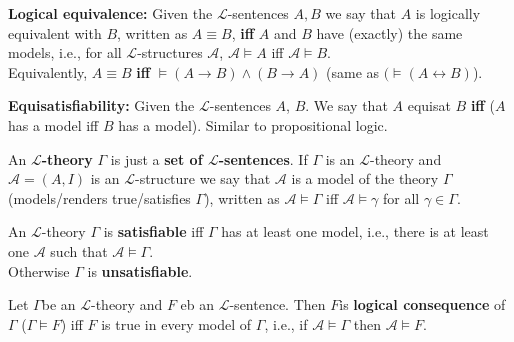 \nn

\begin{definition}
	\textbf{Logical equivalence:} Given the $\mathcal{L}$-sentences $A,B$ we say that $A$ is logically equivalent with $B$, written as $A \equiv B$, \textbf{iff} $A$ and $B$ have (exactly) the same models, i.e., for all $\mathcal{L}$-structures $\mathcal{A}$, $\mathcal{A} \models A$ iff $\mathcal{A} \models B$.\\
	
	Equivalently, $A \equiv B$ \textbf{iff} $\models (A \rightarrow B) \wedge (B \rightarrow A)$ (same as $(\models (A \leftrightarrow B)$).\\
\end{definition}


\begin{definition}
	\textbf{Equisatisfiability:} Given the $\mathcal{L}$-sentences $A$, $B$. We say that $A$ equisat $B$ \textbf{iff} ($A$ has a model iff $B$ has a model). Similar to propositional logic.\\
\end{definition}

\begin{definition}
	An \textbf{$\mathcal{L}$-theory} $\Gamma$ is just a \textbf{set of $\mathcal{L}$-sentences}. If $\Gamma$ is an $\mathcal{L}$-theory and $\mathcal{A} = (A,I)$ is an $\mathcal{L}$-structure we say that $\mathcal{A}$ is a model of the theory $\Gamma$ (models/renders true/satisfies $\Gamma$), written as $\mathcal{A} \models \Gamma$ iff $\mathcal{A} \models \gamma$ for all $\gamma \in \Gamma$.\\
\end{definition}

\begin{definition}
	An $\mathcal{L}$-theory $\Gamma$ is \textbf{satisfiable} iff $\Gamma$ has at least one model, i.e., there is at least one $\mathcal{A}$ such that $\mathcal{A} \models \Gamma$.\\
	Otherwise $\Gamma$ is \textbf{unsatisfiable}.\\
\end{definition}

\begin{definition}
	Let $\Gamma$be an $\mathcal{L}$-theory and $F$ eb an $\mathcal{L}$-sentence. Then $F$is \textbf{logical consequence} of $\Gamma$ ($\Gamma \models F$) iff $F$ is true in every model of $\Gamma$, i.e., if $\mathcal{A} \models \Gamma$ then $\mathcal{A} \models F$.\\
\end{definition}

